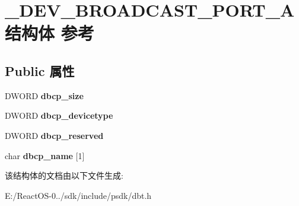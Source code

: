 \hypertarget{struct___d_e_v___b_r_o_a_d_c_a_s_t___p_o_r_t___a}{}\section{\+\_\+\+D\+E\+V\+\_\+\+B\+R\+O\+A\+D\+C\+A\+S\+T\+\_\+\+P\+O\+R\+T\+\_\+\+A结构体 参考}
\label{struct___d_e_v___b_r_o_a_d_c_a_s_t___p_o_r_t___a}
\subsection*{Public 属性}
\begin{DoxyCompactItemize}
\item 
\mbox{\label{struct___d_e_v___b_r_o_a_d_c_a_s_t___p_o_r_t___a_a286638ea0b306276167278beeffc9d45}} 
D\+W\+O\+RD {\bfseries dbcp\+\_\+size}
\item 
\mbox{\label{struct___d_e_v___b_r_o_a_d_c_a_s_t___p_o_r_t___a_a37db0d173710043b7d620ff8ae0df745}} 
D\+W\+O\+RD {\bfseries dbcp\+\_\+devicetype}
\item 
\mbox{\label{struct___d_e_v___b_r_o_a_d_c_a_s_t___p_o_r_t___a_ab94f1e134de2b7d1565feb9c02fcfcd0}} 
D\+W\+O\+RD {\bfseries dbcp\+\_\+reserved}
\item 
\mbox{\label{struct___d_e_v___b_r_o_a_d_c_a_s_t___p_o_r_t___a_aad98bd8741cd4e0646dbf5651f98765c}} 
char {\bfseries dbcp\+\_\+name} \mbox{[}1\mbox{]}
\end{DoxyCompactItemize}


该结构体的文档由以下文件生成\+:\begin{DoxyCompactItemize}
\item 
E\+:/\+React\+O\+S-\/0../sdk/include/psdk/dbt.\+h\end{DoxyCompactItemize}
